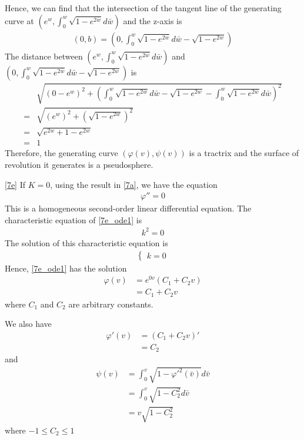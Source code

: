 \documentclass[a4paper]{report}
\begin{document}
Hence, we can find that the intersection of the tangent line of the generating curve at $\left(e^w, \int_{0}^{w} \sqrt{1 - e^{2\bar{w} }}d\bar{w} \right)$ and the z-axis is
\begin{align}
	\left(0,b\right) = \left(0, \int_{0}^{w} \sqrt{1 - e^{2\bar{w} }}d\bar{w} - \sqrt{1 - e^{2w }}\right)
\end{align}
The distance between $\left(e^w, \int_{0}^{w} \sqrt{1 - e^{2\bar{w} }}d\bar{w} \right)$ and $\left(0, \int_{0}^{w} \sqrt{1 - e^{2\bar{w} }}d\bar{w} - \sqrt{1 - e^{2w }}\right)$ is
\begin{align}
	&\sqrt{\left(0 - e^w\right)^2 + \left(\int_{0}^{w} \sqrt{1 - e^{2\bar{w} }}d\bar{w} - \sqrt{1 - e^{2w }} - \int_{0}^{w} \sqrt{1 - e^{2\bar{w} }}d\bar{w}  \right)^2}\\ =& \sqrt{\left(e^w\right)^2 + \left(\sqrt{1 - e^{2w }}\right)^2}\\
	=& \sqrt{e^{2w} + 1 - e^{2w }}\\
	=& 1
\end{align}
Therefore, the generating curve $(\varphi(v), \psi(v))$ is a tractrix and the surface of revolution it generates is a pseudosphere.

\newpage
\ref{7e} 
If $K = 0$, using the result in \ref{7a}, we have the equation
\begin{align}
\varphi''  = 0 \label{7e_ode1}
\end{align}
This is a homogeneous second-order linear differential equation. The characteristic equation of \eqref{7e_ode1} is
\begin{align}
k^2  = 0 
\end{align}
The solution of this characteristic equation is
\begin{align}
\begin{cases}
k = 0
\end{cases}
\end{align} 
Hence, \eqref{7e_ode1} has the solution
\begin{align}
\varphi(v) &= e^{0v} (C_1  + C_2v)\\
 &= C_1  + C_2v \label{7e_phi}
\end{align}
where $C_1$ and $C_2$ are arbitrary constants.

We also have
\begin{align}
\varphi'(v) &= (C_1  + C_2v)'\\
&= C_2
\end{align}
and
\begin{align}
	\psi(v) &= \int_{0}^{v} \sqrt{1 - {\varphi'}^2(\bar{v})} d\bar{v}\\
	&= \int_{0}^{v} \sqrt{1 - C_2^2} d\bar{v}\\
	&= v\sqrt{1 - C_2^2}
\end{align}
where $-1\leq C_2\leq 1$
\end{document}
